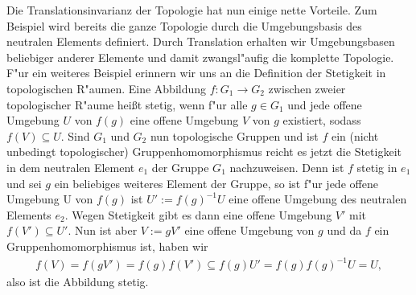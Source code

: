 	Die Translationsinvarianz der Topologie hat nun einige nette Vorteile.
	Zum Beispiel wird bereits die ganze Topologie durch die Umgebungsbasis des neutralen Elements definiert.
	Durch Translation erhalten wir Umgebungsbasen beliebiger anderer Elemente und damit zwangsl"aufig die komplette Topologie.
	F"ur ein weiteres Beispiel erinnern wir uns an die Definition der Stetigkeit in topologischen R"aumen.
	Eine Abbildung $f: G_1 \to G_2$ zwischen zweier topologischer R"aume heißt stetig, wenn f"ur alle $g\in G_1$ und jede offene Umgebung $U$ von $f(g)$ eine offene Umgebung $V$ von $g$ existiert, sodass $f(V)\subseteq U$.
	Sind $G_1$ und $G_2$ nun topologische Gruppen und ist $f$ ein (nicht unbedingt topologischer) Gruppenhomomorphismus reicht es jetzt die Stetigkeit in dem neutralen Element $e_1$ der Gruppe $G_1$ nachzuweisen.
	Denn ist $f$ stetig in $e_1$ und sei $g$ ein beliebiges weiteres Element der Gruppe, so ist f"ur jede offene Umgebung U von $f(g)$ ist $U':=f(g)^{-1}U$ eine offene Umgebung des neutralen Elements $e_2$. 
	Wegen Stetigkeit gibt es dann eine offene Umgebung $V'$ mit $f(V') \subseteq U'$.
	Nun ist aber $V:= gV'$ eine offene Umgebung von $g$ und da $f$ ein Gruppenhomomorphismus ist, haben wir
	\begin{align*}
		f(V) = f(gV') = f(g)f(V') \subseteq f(g) U' =f(g)f(g)^{-1} U = U,
	\end{align*}
	also ist die Abbildung stetig.
	
